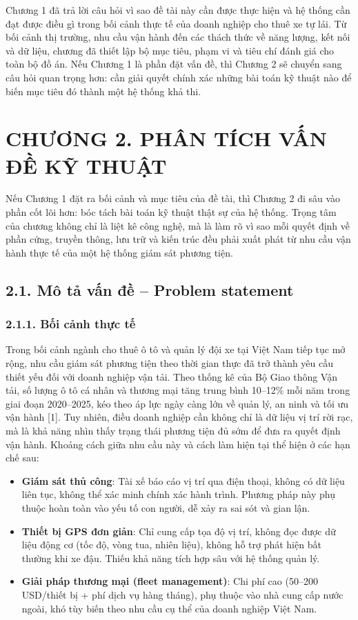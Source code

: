 \documentclass[a4paper]{extarticle}
\newcommand{\chapterheading}[1]{%
  \clearpage
  \phantomsection
  \section*{#1}%
  \addcontentsline{toc}{section}{#1}%
  \setcounter{subsection}{0}%
}
\providecommand{\tightlist}{%
  \setlength{\itemsep}{0pt}\setlength{\parskip}{0pt}}
\begin{document}
Chương 1 đã trả lời câu hỏi vì sao đề tài này cần được thực hiện và hệ
thống cần đạt được điều gì trong bối cảnh thực tế của doanh nghiệp cho
thuê xe tự lái. Từ bối cảnh thị trường, nhu cầu vận hành đến các thách
thức về năng lượng, kết nối và dữ liệu, chương đã thiết lập bộ mục tiêu,
phạm vi và tiêu chí đánh giá cho toàn bộ đồ án. Nếu Chương 1 là phần
đặt vấn đề, thì Chương 2 sẽ chuyển sang câu hỏi quan trọng hơn: cần giải
quyết chính xác những bài toán kỹ thuật nào để biến mục tiêu đó thành
một hệ thống khả thi.

\chapterheading{CHƯƠNG 2. PHÂN TÍCH VẤN ĐỀ KỸ THUẬT}

Nếu Chương 1 đặt ra bối cảnh và mục tiêu của đề tài, thì Chương 2 đi
sâu vào phần cốt lõi hơn: bóc tách bài toán kỹ thuật thật sự của hệ
thống. Trọng tâm của chương không chỉ là liệt kê công nghệ, mà là làm rõ
vì sao mỗi quyết định về phần cứng, truyền thông, lưu trữ và kiến trúc
đều phải xuất phát từ nhu cầu vận hành thực tế của một hệ thống giám sát
phương tiện.

\subsection{2.1. Mô tả vấn đề -- Problem
statement}\label{21-muxf4-tux1ea3-vux1ea5n-ux111ux1ec1--problem-statement}

\subsubsection{2.1.1. Bối cảnh thực
tế}\label{211-bux1ed1i-cux1ea3nh-thux1ef1c-tux1ebf}

Trong bối cảnh ngành cho thuê ô tô và quản lý đội xe tại Việt Nam tiếp
tục mở rộng, nhu cầu giám sát phương tiện theo thời gian thực đã trở
thành yêu cầu thiết yếu đối với doanh nghiệp vận tải. Theo thống kê của
Bộ Giao thông Vận tải, số lượng ô tô cá nhân và thương mại tăng trung
bình 10--12\% mỗi năm trong giai đoạn 2020--2025, kéo theo áp lực ngày
càng lớn về quản lý, an ninh và tối ưu vận hành {[}1{]}. Tuy nhiên, điều
doanh nghiệp cần không chỉ là dữ liệu vị trí rời rạc, mà là khả năng
nhìn thấy trạng thái phương tiện đủ sớm để đưa ra quyết định vận hành.
Khoảng cách giữa nhu cầu này và cách làm hiện tại thể hiện ở các hạn chế
sau:

\begin{itemize}
\tightlist
\item
  \textbf{Giám sát thủ công}: Tài xế báo cáo vị trí qua điện thoại,
  không có dữ liệu liên tục, không thể xác minh chính xác hành trình.
  Phương pháp này phụ thuộc hoàn toàn vào yếu tố con người, dễ xảy ra
  sai sót và gian lận.
\item
  \textbf{Thiết bị GPS đơn giản}: Chỉ cung cấp tọa độ vị trí, không đọc
  được dữ liệu động cơ (tốc độ, vòng tua, nhiên liệu), không hỗ trợ phát
  hiện bất thường khi xe đậu. Thiếu khả năng tích hợp sâu với hệ thống
  quản lý.
\item
  \textbf{Giải pháp thương mại (fleet management)}: Chi phí cao (50--200
  USD/thiết bị + phí dịch vụ hàng tháng), phụ thuộc vào nhà cung cấp
  nước ngoài, khó tùy biến theo nhu cầu cụ thể của doanh nghiệp Việt
  Nam.
\end{itemize}
\end{document}

